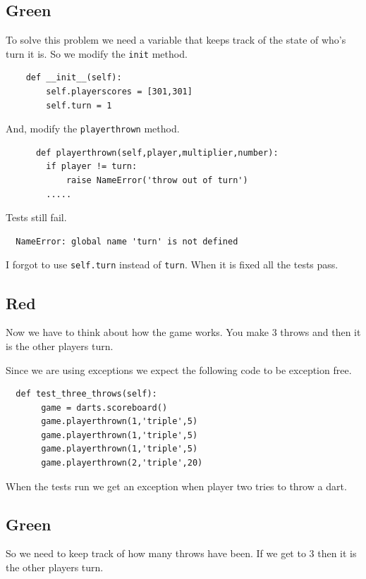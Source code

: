 \documentclass{paper}
\begin{document}
\subsection{Green}
 To solve this problem we need a variable that keeps track of the
 state of who's turn it is. So we modify the {\tt init} method.
 \begin{lstlisting}
    def __init__(self):
        self.playerscores = [301,301]
        self.turn = 1
 \end{lstlisting}
And, modify the {\tt playerthrown} method. 
\begin{lstlisting}
      def playerthrown(self,player,multiplier,number):
        if player != turn:
            raise NameError('throw out of turn')
        .....
\end{lstlisting}

Tests still fail. 
\begin{verbatim}
  NameError: global name 'turn' is not defined
\end{verbatim}
I forgot to use {\tt self.turn} instead of {\tt turn}. When it is
fixed all the tests pass.

\subsection{Red}
 Now we have to think about how the game works. 
 You make 3 throws and then it is the other players turn.

 Since we are using exceptions we expect the following code to be
 exception free.

\begin{lstlisting}
  def test_three_throws(self):
       game = darts.scoreboard()
       game.playerthrown(1,'triple',5)
       game.playerthrown(1,'triple',5)
       game.playerthrown(1,'triple',5)
       game.playerthrown(2,'triple',20)
\end{lstlisting}
When the tests run we get an exception when player two tries to throw
a dart.
\subsection{Green}
So we need to keep track of how many throws have been. If we get to 3
then it is the other players turn.
\end{document}
